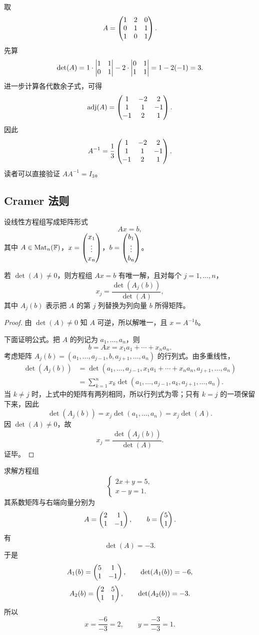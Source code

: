 \begin{example}
取
\[
A=\begin{pmatrix} 1&2&0\\0&1&1\\1&0&1 \end{pmatrix}.
\]
先算
\[
\det(A)=1\cdot\begin{vmatrix} 1&1\\0&1 \end{vmatrix}-2\cdot\begin{vmatrix} 0&1\\1&1 \end{vmatrix}=1-2(-1)=3.
\]
进一步计算各代数余子式，可得
\[
\operatorname{adj}(A)=\begin{pmatrix} 1&-2&2\\1&1&-1\\-1&2&1 \end{pmatrix}.
\]
因此
\[
A^{-1}=\frac13\begin{pmatrix} 1&-2&2\\1&1&-1\\-1&2&1 \end{pmatrix}.
\]
读者可以直接验证 $AA^{-1}=I_3$。
\end{example}

\subsection{Cramer 法则}

设线性方程组写成矩阵形式
\[
Ax=b,
\]
其中 $A\in\mathrm{Mat}_n(\mathbb{F})$，$x=\begin{pmatrix} x_1\\\vdots\\x_n \end{pmatrix}$，$b=\begin{pmatrix} b_1\\\vdots\\b_n \end{pmatrix}$。

\begin{theorem}[Cramer 法则]
若 $\det(A)\ne 0$，则方程组 $Ax=b$ 有唯一解，且对每个 $j=1,\dots,n$，
\[
x_j=\frac{\det(A_j(b))}{\det(A)},
\]
其中 $A_j(b)$ 表示把 $A$ 的第 $j$ 列替换为列向量 $b$ 所得矩阵。
\end{theorem}

\begin{proof}
由 $\det(A)\ne 0$ 知 $A$ 可逆，所以解唯一，且 $x=A^{-1}b$。

下面证明公式。把 $A$ 的列记为 $a_1,\dots,a_n$，则
\[
b=Ax=x_1a_1+\cdots+x_na_n.
\]
考虑矩阵 $A_j(b)=(a_1,\dots,a_{j-1},b,a_{j+1},\dots,a_n)$ 的行列式。由多重线性，
\begin{align*}
\det(A_j(b))
&=\det(a_1,\dots,a_{j-1},x_1a_1+\cdots+x_na_n,a_{j+1},\dots,a_n)\\
&=\sum_{k=1}^n x_k\det(a_1,\dots,a_{j-1},a_k,a_{j+1},\dots,a_n).
\end{align*}
当 $k\ne j$ 时，上式中的矩阵有两列相同，所以行列式为零；只有 $k=j$ 的一项保留下来，因此
\[
\det(A_j(b))=x_j\det(a_1,\dots,a_n)=x_j\det(A).
\]
因 $\det(A)\ne 0$，故
\[
x_j=\frac{\det(A_j(b))}{\det(A)}.
\]
证毕。
\end{proof}

\begin{example}
求解方程组
\[
\begin{cases}
2x+y=5,\\
x-y=1.
\end{cases}
\]
其系数矩阵与右端向量分别为
\[
A=\begin{pmatrix} 2&1\\1&-1 \end{pmatrix},\qquad b=\begin{pmatrix} 5\\1 \end{pmatrix}.
\]
有
\[
\det(A)=-3.
\]
于是
\[
A_1(b)=\begin{pmatrix} 5&1\\1&-1 \end{pmatrix},\qquad \det(A_1(b))=-6,
\]
\[
A_2(b)=\begin{pmatrix} 2&5\\1&1 \end{pmatrix},\qquad \det(A_2(b))=-3.
\]
所以
\[
x=\frac{-6}{-3}=2,
\qquad
y=\frac{-3}{-3}=1.
\]
\end{example}

